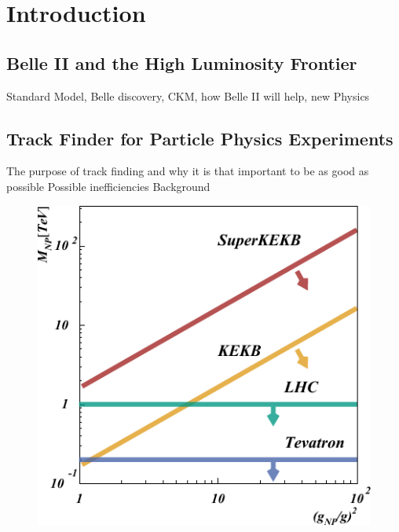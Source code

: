 \chapter{Introduction}
\section{Belle II and the High Luminosity Frontier}
Standard Model, Belle discovery, CKM, how Belle II will help, new Physics
\section{Track Finder for Particle Physics Experiments}
The purpose of track finding and why it is that important to be as good as possible
Possible inefficiencies
Background

\begin{figure}
  \centering
  \includegraphics[width=0.6\linewidth]{figures/general/luminosity.pdf}
  \caption{\cite{tdr}}
\end{figure}

